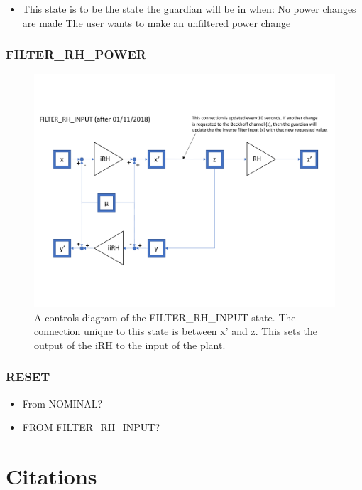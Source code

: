 \documentclass{article}
\begin{document}
\begin{itemize}
\item This state is to be the state the guardian will be in when: 
\subitem No power changes are made
\subitem The user wants to make an unfiltered power change
\end{itemize}

\subsubsection{FILTER\_RH\_POWER}


\begin{figure}[H]
    \centering
    \includegraphics[width=1\textwidth]{FILTER_RH_INPUT_DIAGRAM.pdf}
    \caption{A controls diagram of the FILTER\_RH\_INPUT state. The connection unique to this state is between x' and z. This sets the output of the iRH to the input of the plant.  }
\end{figure}
\subsubsection{RESET}
\begin{itemize}
\item From NOMINAL?

\item FROM FILTER\_RH\_INPUT?
\end{itemize}

\section{Citations}
\end{document}
